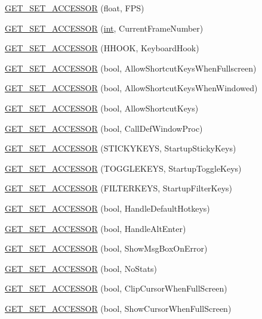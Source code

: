 \begin{DoxyCompactItemize}
\item 
\hyperlink{class_d_x_u_t_state_accc97e39d9e6ed9d7bf119742bc80a33}{GET\_\-SET\_\-ACCESSOR} (float, FPS)
\item 
\hyperlink{class_d_x_u_t_state_acecf3e26898c43cf90661b119dd6aa63}{GET\_\-SET\_\-ACCESSOR} (\hyperlink{_d_x_u_tgui_8cpp_a2d77ed03302b6978834ee3b6f57837fb}{int}, CurrentFrameNumber)
\item 
\hyperlink{class_d_x_u_t_state_a6db584f64504aa1868d15b3a144d2097}{GET\_\-SET\_\-ACCESSOR} (HHOOK, KeyboardHook)
\item 
\hyperlink{class_d_x_u_t_state_a240e919faaf9d6d4e7ebeb09305c971a}{GET\_\-SET\_\-ACCESSOR} (bool, AllowShortcutKeysWhenFullscreen)
\item 
\hyperlink{class_d_x_u_t_state_ac133142352b310bb0ec40522f02c34c2}{GET\_\-SET\_\-ACCESSOR} (bool, AllowShortcutKeysWhenWindowed)
\item 
\hyperlink{class_d_x_u_t_state_a06e20d8a4bcc8ebba013abd0a33fea39}{GET\_\-SET\_\-ACCESSOR} (bool, AllowShortcutKeys)
\item 
\hyperlink{class_d_x_u_t_state_a88270222bc6d87a610b94309d35a5d4c}{GET\_\-SET\_\-ACCESSOR} (bool, CallDefWindowProc)
\item 
\hyperlink{class_d_x_u_t_state_ad8ae97695fda015e78fcdf3538f368e7}{GET\_\-SET\_\-ACCESSOR} (STICKYKEYS, StartupStickyKeys)
\item 
\hyperlink{class_d_x_u_t_state_a2a538af499891a9dca7af0a597c969a7}{GET\_\-SET\_\-ACCESSOR} (TOGGLEKEYS, StartupToggleKeys)
\item 
\hyperlink{class_d_x_u_t_state_adb16f4a32a8c334efa700d236c4b3f1f}{GET\_\-SET\_\-ACCESSOR} (FILTERKEYS, StartupFilterKeys)
\item 
\hyperlink{class_d_x_u_t_state_a6b7b328201a569abda3170002bdf4425}{GET\_\-SET\_\-ACCESSOR} (bool, HandleDefaultHotkeys)
\item 
\hyperlink{class_d_x_u_t_state_a981afeeb5288f87cb108aea494aeb8b1}{GET\_\-SET\_\-ACCESSOR} (bool, HandleAltEnter)
\item 
\hyperlink{class_d_x_u_t_state_a44b27d2dd1faa77b891d872072cf1c74}{GET\_\-SET\_\-ACCESSOR} (bool, ShowMsgBoxOnError)
\item 
\hyperlink{class_d_x_u_t_state_a1b5b19c4a6f615466138fe64650e5327}{GET\_\-SET\_\-ACCESSOR} (bool, NoStats)
\item 
\hyperlink{class_d_x_u_t_state_ae283ff2e049bdfeea771c4455f22cd45}{GET\_\-SET\_\-ACCESSOR} (bool, ClipCursorWhenFullScreen)
\item 
\hyperlink{class_d_x_u_t_state_a7837099484fc89dcfbe7e946ddfa110b}{GET\_\-SET\_\-ACCESSOR} (bool, ShowCursorWhenFullScreen)

\end{DoxyCompactItemize}
